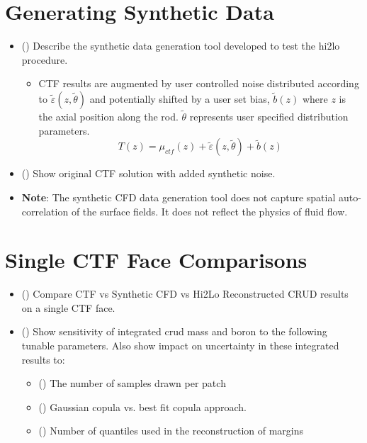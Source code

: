 
\section{Generating Synthetic Data}

\begin{itemize}
    \item (\checkmark) Describe the synthetic data generation tool developed to test the hi2lo procedure.
        \begin{itemize}
            \item CTF results are augmented by user controlled noise distributed according to
                $\tilde \varepsilon(z, \tilde \theta)$
                and potentially shifted by a user set bias,
                $\tilde b(z)$ where $z$ is the axial position along the rod.
                $\tilde \theta$ represents user specified distribution parameters.
                \begin{equation}
                    T(z) = \mu_{ctf}(z) + \tilde \varepsilon (z, \tilde \theta) + \tilde b(z)
                \end{equation}
        \end{itemize}
    \item (\checkmark) Show original CTF solution with added synthetic noise.
    \item \textbf{Note}: The synthetic CFD data generation tool does not capture spatial auto-correlation of the surface fields.  It does not reflect
        the physics of fluid flow.
\end{itemize}

\section{Single CTF Face Comparisons}
\begin{itemize}
    \item (\checkmark) Compare CTF vs Synthetic CFD vs Hi2Lo Reconstructed CRUD results on a single CTF face.
    \item (\checkmark) Show sensitivity of integrated crud mass and boron to the following tunable parameters.  Also show impact on uncertainty in these integrated results to:
        \begin{itemize}
            \item (\checkmark) The number of samples drawn per patch
            \item (\checkmark) Gaussian copula vs. best fit copula approach.
            \item (\checkmark) Number of quantiles used in the reconstruction of margins
        \end{itemize}
\end{itemize}

